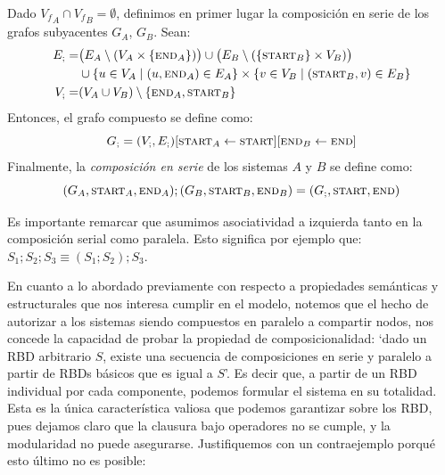 \begin{definition}
    Dado ${V_f}_A \cap {V_f}_B = \emptyset$, definimos en primer lugar la composición en serie de los grafos subyacentes $G_A$, $G_B$. Sean:
    \begin{align*}
    E_{;} =& \big(E_A \setminus (V_A \times \{\textsc{end}_A\})\big) \cup \big(E_B \setminus (\{\textsc{start}_B\} \times V_B)\big) \\
           & \cup \{u \in V_A \mid (u,\textsc{end}_A) \in E_A\} \times \{v \in V_B \mid (\textsc{start}_B,v) \in E_B\} \\
    V_{;} =& (V_A \cup V_B) \setminus \{\textsc{end}_A, \textsc{start}_B\} 
    \end{align*}
    Entonces, el grafo compuesto se define como:
    \[
        G_; = (V_;, E_{;})[\textsc{start}_A \leftarrow \textsc{start}][\textsc{end}_B \leftarrow \textsc{end}]
    \]
    Finalmente, la \textit{composición en serie} de los sistemas $A$ y $B$ se define como:
    \[
        (G_{A}, \textsc{start}_{A}, \textsc{end}_{A}) ; (G_{B}, \textsc{start}_{B}, \textsc{end}_{B}) = (G_; , \textsc{start}, \textsc{end})
    \]
\end{definition}

Es importante remarcar que asumimos asociatividad a izquierda tanto en la composición serial como paralela. Esto significa por ejemplo que: $S_1 ; S_2 ; S_3 \equiv (S_1 ; S_2) ; S_3$.

En cuanto a lo abordado previamente con respecto a propiedades semánticas y estructurales que nos interesa cumplir en el modelo, notemos que el hecho de autorizar a los sistemas siendo compuestos en paralelo a compartir nodos, nos concede la capacidad de probar la propiedad de composicionalidad: `dado un RBD arbitrario $S$, existe una secuencia de composiciones en serie y paralelo a partir de RBDs básicos que es igual a $S$'. Es decir que, a partir de un RBD individual por cada componente, podemos formular el sistema en su totalidad. Esta es la única característica valiosa que podemos garantizar sobre los RBD, pues dejamos claro que la clausura bajo operadores no se cumple, y la modularidad no puede asegurarse. Justifiquemos con un contraejemplo porqué esto último no es posible:

